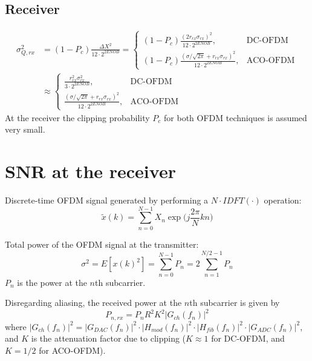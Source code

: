 \documentclass[a4paper]{article}
\begin{document}
\subsection{Receiver}
\begin{align} \nonumber
\sigma^2_{Q,rx} & = (1-P_c)\frac{\Delta X^2}{12\cdot 2^{2ENOB}} = \begin{cases}
(1-P_c)\frac{(2r_{rx}\sigma_{rx})^2}{12\cdot 2^{2ENOB}}, &\text{DC-OFDM} \\
(1-P_c)\frac{(\sigma/\sqrt{2\pi} + r_{rx}\sigma_{rx})^2}{12\cdot 2^{2ENOB}}, &\text{ACO-OFDM}
\end{cases} \\ \nonumber
& \approx \begin{cases}
\frac{r_{rx}^2\sigma_{rx}^2}{3\cdot 2^{2ENOB}}, &\text{DC-OFDM} \\
\frac{(\sigma/\sqrt{2\pi} + r_{rx}\sigma_{rx})^2}{12\cdot 2^{2ENOB}}, &\text{ACO-OFDM}
\end{cases}
\end{align}
At the receiver the clipping probability $P_c$ for both OFDM techniques is assumed very small.

\section{SNR at the receiver}

Discrete-time OFDM signal generated by performing a $N\cdot IDFT(\cdot)$ operation:
\begin{equation}
\tilde{x}(k) = \sum_{n = 0}^{N-1}X_n\exp\bigg(j\frac{2\pi}{N}kn\bigg)
\end{equation}

Total power of the OFDM signal at the transmitter:
\begin{equation}
\sigma^2 = E[x(k)^2] = \sum_{n = 0}^{N-1} P_n = 2\sum_{n = 1}^{N/2-1} P_n
\end{equation}
$P_n$ is the power at the $n$th subcarrier.

Disregarding aliasing, the received power at the $n$th subcarrier is given by
\begin{equation}
P_{n,rx} = P_nR^2K^2|G_{ch}(f_n)|^2
\end{equation}
where $|G_{ch}(f_n)|^2 = |G_{DAC}(f_n)|^2\cdot|H_{mod}(f_n)|^2\cdot|H_{fib}(f_n)|^2\cdot|G_{ADC}(f_n)|^2$, and $K$ is the attenuation factor due to clipping ($K \approx 1$ for DC-OFDM, and $K = 1/2$ for ACO-OFDM). 
\end{document}
